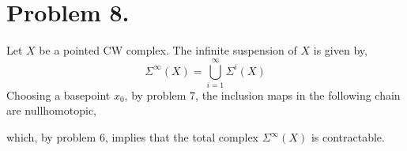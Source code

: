 \documentclass[12pt]{extarticle}
\begin{document}
\section*{Problem 8.}

Let $X$ be a pointed CW complex. The infinite suspension of $X$ is given by,
\[ \Sigma^\infty (X) = \bigcup_{i = 1}^\infty \Sigma^i(X) \]
Choosing a basepoint $x_0$, by problem $7$, the inclusion maps in the following chain are nullhomotopic,
\begin{center}
\end{center} 
which, by problem $6$, implies that the total complex $\Sigma^\infty(X)$ is contractable.
\end{document}
